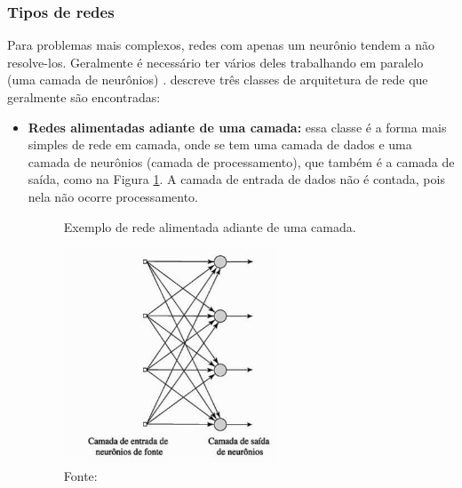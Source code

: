 \subsubsection{Tipos de redes}
Para problemas mais complexos, redes com apenas um neurônio tendem a não resolve-los. Geralmente é necessário ter vários deles trabalhando em paralelo (uma camada de neurônios) \cite{Demuth:2014:NND:2721661}. \cite{haykin2001} descreve três classes de arquitetura de rede que geralmente são encontradas:
\begin{itemize}
\item \textbf{Redes alimentadas adiante de uma camada:} essa classe é a forma mais simples de rede em camada, onde se tem uma camada de dados e uma camada de neurônios (camada de processamento), que também é a camada de saída, como na Figura \ref{fig:umacamada}. A camada de entrada de dados não é contada, pois nela não ocorre processamento.
\begin{figure}[H]
  \centering
  \caption{Exemplo de rede alimentada adiante de uma camada.}
  \includegraphics[width=180pt]{dados/figuras/uma_camada}
  \caption*{Fonte: \cite{haykin2001}}
  \label{fig:umacamada}
\end{figure}


\end{itemize}
